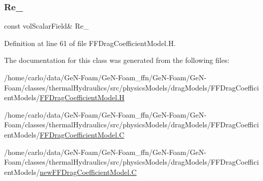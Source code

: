 \subsubsection{\texorpdfstring{Re\+\_\+}{Re\_}}
{\footnotesize\ttfamily const vol\+Scalar\+Field\& Re\+\_\+\hspace{0.3cm}{\ttfamily [protected]}}



Definition at line 61 of file F\+F\+Drag\+Coefficient\+Model.\+H.



The documentation for this class was generated from the following files\+:\begin{DoxyCompactItemize}
\item 
/home/carlo/data/\+Ge\+N-\/\+Foam/\+Ge\+N-\/\+Foam\+\_\+ffn/\+Ge\+N-\/\+Foam/\+Ge\+N-\/\+Foam/classes/thermal\+Hydraulics/src/physics\+Models/drag\+Models/\+F\+F\+Drag\+Coefficient\+Models/\hyperlink{FFDragCoefficientModel_8H}{F\+F\+Drag\+Coefficient\+Model.\+H}\item 
/home/carlo/data/\+Ge\+N-\/\+Foam/\+Ge\+N-\/\+Foam\+\_\+ffn/\+Ge\+N-\/\+Foam/\+Ge\+N-\/\+Foam/classes/thermal\+Hydraulics/src/physics\+Models/drag\+Models/\+F\+F\+Drag\+Coefficient\+Models/\hyperlink{FFDragCoefficientModel_8C}{F\+F\+Drag\+Coefficient\+Model.\+C}\item 
/home/carlo/data/\+Ge\+N-\/\+Foam/\+Ge\+N-\/\+Foam\+\_\+ffn/\+Ge\+N-\/\+Foam/\+Ge\+N-\/\+Foam/classes/thermal\+Hydraulics/src/physics\+Models/drag\+Models/\+F\+F\+Drag\+Coefficient\+Models/\hyperlink{newFFDragCoefficientModel_8C}{new\+F\+F\+Drag\+Coefficient\+Model.\+C}\end{DoxyCompactItemize}
